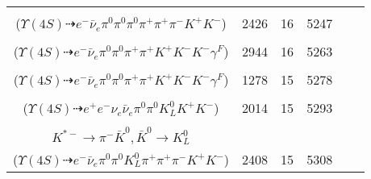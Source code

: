 \documentclass[landscape]{article}
\newcounter{rownumbers}
\newcommand\rn{\stepcounter{rownumbers}\arabic{rownumbers}}
\newcommand{\EOL}{\\} %
\newcommand{\topoTags}[1]{#1} %
\begin{document}
\begin{longtable}{clcccc}
\rn & \makecell[l]{ $ 
\Upsilon(4S) \rightarrow B^{0} \bar{B}^{0} ,
B^{0} \rightarrow \pi^{0} K^{+} K^{-} ,
\bar{B}^{0} \rightarrow e^{-} \bar{\nu}_{e} D^{*+} ,
D^{*+} \rightarrow \pi^{0} D^{+} ,
D^{+} \rightarrow \pi^{0} \pi^{+} K_{S}^{0} ,
K_{S}^{0} \rightarrow \pi^{+} \pi^{-} 
$ \\ ($
\Upsilon(4S) \dashrightarrow e^{-} \bar{\nu}_{e} \pi^{0} \pi^{0} \pi^{0} \pi^{+} \pi^{+} \pi^{-} K^{+} K^{-} 
$) } & \topoTags{2426 & }16 & 5247 \EOL

\rn & \makecell[l]{ $ 
\Upsilon(4S) \rightarrow B^{0} \bar{B}^{0} ,
B^{0} \rightarrow \pi^{0} K^{+} K^{-} \gamma^{F} ,
\bar{B}^{0} \rightarrow e^{-} \bar{\nu}_{e} D^{*+} ,
D^{*+} \rightarrow \pi^{+} D^{0} ,
D^{0} \rightarrow \pi^{0} \pi^{+} K^{-} 
$ \\ ($
\Upsilon(4S) \dashrightarrow e^{-} \bar{\nu}_{e} \pi^{0} \pi^{0} \pi^{+} \pi^{+} K^{+} K^{-} K^{-} \gamma^{F} 
$) } & \topoTags{2944 & }16 & 5263 \EOL

\rn & \makecell[l]{ $ 
\Upsilon(4S) \rightarrow B^{0} \bar{B}^{0} ,
B^{0} \rightarrow \pi^{0} K^{+} K^{-} ,
\bar{B}^{0} \rightarrow e^{-} \bar{\nu}_{e} D^{*+} ,
D^{*+} \rightarrow \pi^{+} D^{0} ,
D^{0} \rightarrow \pi^{0} \pi^{+} K^{-} \gamma^{F} 
$ \\ ($
\Upsilon(4S) \dashrightarrow e^{-} \bar{\nu}_{e} \pi^{0} \pi^{0} \pi^{+} \pi^{+} K^{+} K^{-} K^{-} \gamma^{F} 
$) } & \topoTags{1278 & }15 & 5278 \EOL

\rn & \makecell[l]{ $ 
\Upsilon(4S) \rightarrow B^{0} \bar{B}^{0} ,
B^{0} \rightarrow \pi^{0} K^{+} K^{-} ,
\bar{B}^{0} \rightarrow e^{-} \bar{\nu}_{e} D^{*+} ,
D^{*+} \rightarrow \pi^{0} D^{+} ,
D^{+} \rightarrow e^{+} \nu_{e} \bar{K}^{0} ,
\bar{K}^{0} \rightarrow K_{L}^{0} 
$ \\ ($
\Upsilon(4S) \dashrightarrow e^{+} e^{-} \nu_{e} \bar{\nu}_{e} \pi^{0} \pi^{0} K_{L}^{0} K^{+} K^{-} 
$) } & \topoTags{2014 & }15 & 5293 \EOL

\rn & \makecell[l]{ $ 
\Upsilon(4S) \rightarrow B^{0} \bar{B}^{0} ,
B^{0} \rightarrow \pi^{0} K^{+} K^{-} ,
\bar{B}^{0} \rightarrow e^{-} \bar{\nu}_{e} D^{*+} ,
D^{*+} \rightarrow \pi^{+} D^{0} ,
D^{0} \rightarrow \rho^{+} K^{*-} ,
\rho^{+} \rightarrow \pi^{0} \pi^{+} ,
$ \\ $
K^{*-} \rightarrow \pi^{-} \bar{K}^{0} ,
\bar{K}^{0} \rightarrow K_{L}^{0} 
$ \\ ($
\Upsilon(4S) \dashrightarrow e^{-} \bar{\nu}_{e} \pi^{0} \pi^{0} K_{L}^{0} \pi^{+} \pi^{+} \pi^{-} K^{+} K^{-} 
$) } & \topoTags{2408 & }15 & 5308 \EOL


\end{longtable}
\end{document}
